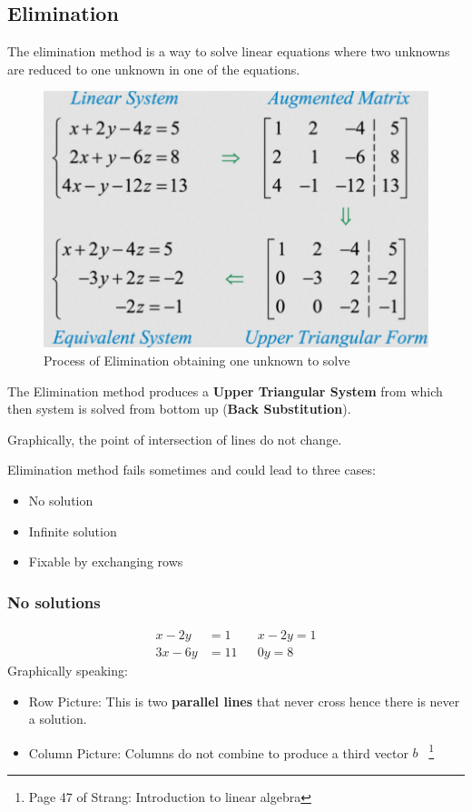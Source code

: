 \documentclass[10pt,a4paper]{article}
\begin{document}
\subsection{Elimination}
The elimination method is a way to solve linear equations where two unknowns are reduced to one
unknown in one of the equations. \par 
\begin{figure}[h!]
	\centering
	\includegraphics[scale=0.4]{Elimination.PNG}
	\caption{Process of Elimination obtaining one unknown to solve}
	\label{}
\end{figure}
The Elimination method produces a \textbf{Upper Triangular System} from which then system is solved
from bottom up (\textbf{Back Substitution}). \par 
Graphically, the point of intersection of lines do not change. \par 
Elimination method fails sometimes and could lead to three cases:
\begin{itemize}
	\item No solution
	\item Infinite solution
	\item Fixable by exchanging rows
\end{itemize}
\subsubsection{No solutions}
\begin{align*} 
	x - 2y &=  1 && x-2y =1\\ 
	3x - 6y &=  11 && 0y=8
\end{align*}
Graphically speaking:
\begin{itemize}
	\item Row Picture: This is two \textbf{parallel lines} that never cross hence there is never a
	solution.
	\item Column Picture: Columns do not combine to produce a third vector $b$ \ \footnote{Page 47 of Strang: Introduction to linear algebra}
\end{itemize} 
\end{document}
